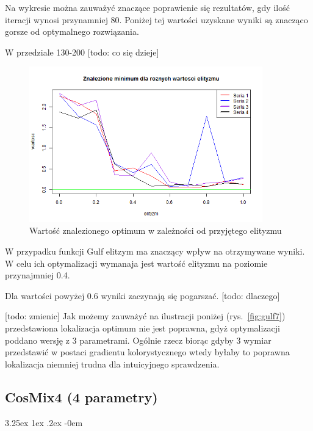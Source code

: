 \documentclass[11pt, a4paper]{article}
\makeatletter
\newcommand{\fbi}{\leavevmode{\parindent=1em\indent}}
\renewcommand\paragraph{\@startsection{paragraph}{5}{\z@}%
  {3.25ex \@plus1ex \@minus.2ex}%
  {-0em}%
  {\normalfont\normalsize\bfseries}}
\makeatother
\begin{document}
\fbi
Na wykresie można zauważyć znaczące poprawienie się rezultatów, gdy ilość iteracji wynosi przynamniej 80. Poniżej tej wartości uzyskane wyniki są znacząco gorsze od optymalnego rozwiązania. 

\fbi
W przedziale 130-200 [todo: co się dzieje]


\begin{figure}[H]
	\begin{center}
		\includegraphics[width=0.9\textwidth]{./assets/Gulf6.png} %
		\caption{Wartość znalezionego optimum w zależności od przyjętego elityzmu}
		\label{fig:gulf6}
	\end{center}
\end{figure}

\fbi
W przypadku funkcji Gulf elitzym ma znaczący wpływ na otrzymywane wyniki. W celu ich optymalizacji wymanaja jest wartość elityzmu na poziomie przynajmniej 0.4.

\fbi
Dla wartości powyżej 0.6 wyniki zaczynają się pogarszać. [todo: dlaczego]


\fbi
[todo: zmienic]
Jak możemy zauważyć na ilustracji poniżej (rys.~\ref{fig:gulf7}) przedstawiona lokalizacja optimum nie jest poprawna, gdyż optymalizacji poddano wersję z 3 parametrami. Ogólnie rzecz biorąc gdyby 3 wymiar przedstawić w postaci gradientu kolorystycznego wtedy byłaby to poprawna lokalizacja niemniej trudna dla intuicyjnego sprawdzenia.

\newpage
\subsection{CosMix4 (4 parametry)}
\paragraph{}
\end{document}
